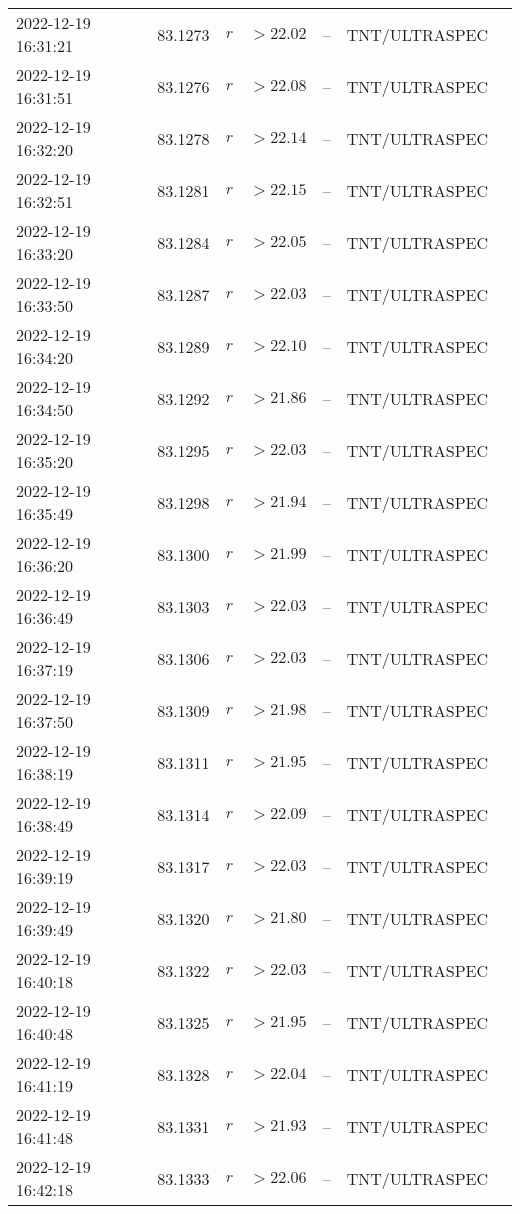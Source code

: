 \documentclass{nature_plusfigure}
\begin{document}
\begin{supplement}
\begin{center}
\begin{longtable}{lllllll}
2022-12-19 16:31:21 & 83.1273 & $r$ & $>22.02$ & -- & TNT/ULTRASPEC &  \\ 
2022-12-19 16:31:51 & 83.1276 & $r$ & $>22.08$ & -- & TNT/ULTRASPEC &  \\ 
2022-12-19 16:32:20 & 83.1278 & $r$ & $>22.14$ & -- & TNT/ULTRASPEC &  \\ 
2022-12-19 16:32:51 & 83.1281 & $r$ & $>22.15$ & -- & TNT/ULTRASPEC &  \\ 
2022-12-19 16:33:20 & 83.1284 & $r$ & $>22.05$ & -- & TNT/ULTRASPEC &  \\ 
2022-12-19 16:33:50 & 83.1287 & $r$ & $>22.03$ & -- & TNT/ULTRASPEC &  \\ 
2022-12-19 16:34:20 & 83.1289 & $r$ & $>22.10$ & -- & TNT/ULTRASPEC &  \\ 
2022-12-19 16:34:50 & 83.1292 & $r$ & $>21.86$ & -- & TNT/ULTRASPEC &  \\ 
2022-12-19 16:35:20 & 83.1295 & $r$ & $>22.03$ & -- & TNT/ULTRASPEC &  \\ 
2022-12-19 16:35:49 & 83.1298 & $r$ & $>21.94$ & -- & TNT/ULTRASPEC &  \\ 
2022-12-19 16:36:20 & 83.1300 & $r$ & $>21.99$ & -- & TNT/ULTRASPEC &  \\ 
2022-12-19 16:36:49 & 83.1303 & $r$ & $>22.03$ & -- & TNT/ULTRASPEC &  \\ 
2022-12-19 16:37:19 & 83.1306 & $r$ & $>22.03$ & -- & TNT/ULTRASPEC &  \\ 
2022-12-19 16:37:50 & 83.1309 & $r$ & $>21.98$ & -- & TNT/ULTRASPEC &  \\ 
2022-12-19 16:38:19 & 83.1311 & $r$ & $>21.95$ & -- & TNT/ULTRASPEC &  \\ 
2022-12-19 16:38:49 & 83.1314 & $r$ & $>22.09$ & -- & TNT/ULTRASPEC &  \\ 
2022-12-19 16:39:19 & 83.1317 & $r$ & $>22.03$ & -- & TNT/ULTRASPEC &  \\ 
2022-12-19 16:39:49 & 83.1320 & $r$ & $>21.80$ & -- & TNT/ULTRASPEC &  \\ 
2022-12-19 16:40:18 & 83.1322 & $r$ & $>22.03$ & -- & TNT/ULTRASPEC &  \\ 
2022-12-19 16:40:48 & 83.1325 & $r$ & $>21.95$ & -- & TNT/ULTRASPEC &  \\ 
2022-12-19 16:41:19 & 83.1328 & $r$ & $>22.04$ & -- & TNT/ULTRASPEC &  \\ 
2022-12-19 16:41:48 & 83.1331 & $r$ & $>21.93$ & -- & TNT/ULTRASPEC &  \\ 
2022-12-19 16:42:18 & 83.1333 & $r$ & $>22.06$ & -- & TNT/ULTRASPEC &  \\ 

\end{longtable}
\end{center}
\end{supplement}
\end{document}

